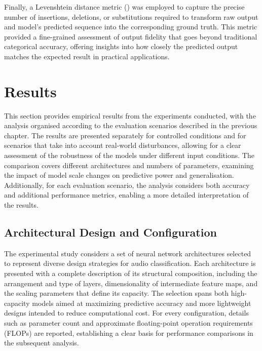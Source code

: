 \documentclass[a4paper,11pt,twoside]{report}
\theoremstyle{definition}
\begin{document}

Finally, a Levenshtein distance metric (\cite{levenshtein}) was employed to capture the precise number of insertions, deletions, or substitutions required to transform raw output and model's predicted sequence into the corresponding ground truth. This metric provided a fine-grained assessment of output fidelity that goes beyond traditional categorical accuracy, offering insights into how closely the predicted output matches the expected result in practical applications.


\chapter{Results}

This section provides empirical results from the experiments conducted, with the analysis organised according to the evaluation scenarios described in the previous chapter. The results are presented separately for controlled conditions and for scenarios that take into account real-world disturbances, allowing for a clear assessment of the robustness of the models under different input conditions. The comparison covers different architectures and numbers of parameters, examining the impact of model scale changes on predictive power and generalisation. Additionally, for each evaluation scenario, the analysis considers both accuracy and additional performance metrics, enabling a more detailed interpretation of the results.

\section{Architectural Design and Configuration}

The experimental study considers a set of neural network architectures selected to represent diverse design strategies for audio classification. Each architecture is presented with a complete description of its structural composition, including the arrangement and type of layers, dimensionality of intermediate feature maps, and the scaling parameters that define its capacity. The selection spans both high-capacity models aimed at maximizing predictive accuracy and more lightweight designs intended to reduce computational cost. For every configuration, details such as parameter count and approximate floating-point operation requirements (FLOPs) are reported, establishing a clear basis for performance comparisons in the subsequent analysis.
\end{document}
